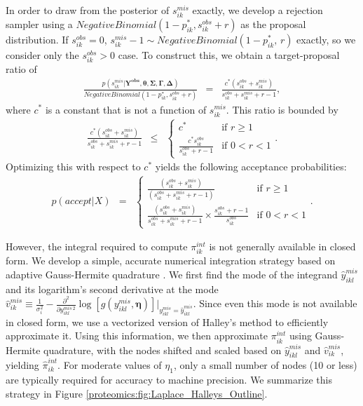 
In order to draw from the posterior of $s_{ik}^{mis}$ exactly, we develop a rejection sampler using a $NegativeBinomial(1 - p_{ik}^*, s_{ik}^{obs} + r)$ as the proposal distribution.
If $s_{ik}^{obs}=0$, $s_{ik}^{mis} - 1 \sim NegativeBinomial(1-p_{ik}^*, \, r)$ exactly, so we consider only the $s_{ik}^{obs} > 0$ case.
To construct this, we obtain a target-proposal ratio of 
\begin{eqnarray*}
\frac{p(s_{ik}^{mis}\vert\mathbf{Y^{obs}},\boldsymbol{\theta},\boldsymbol{\Sigma},\boldsymbol{\Gamma},\boldsymbol{\Delta})}{NegativeBinomial(1-p_{ik}^{*},s_{ik}^{obs}+r)} & = & \frac{c^{*}(s_{ik}^{obs}+s_{ik}^{mis})}{s_{ik}^{obs}+s_{ik}^{mis}+r-1},
\end{eqnarray*}
where $c^{*}$ is a constant that is not a function of $s_{ik}^{mis}$.
This ratio is bounded by
\begin{eqnarray*}
\frac{c^{*}(s_{ik}^{obs}+s_{ik}^{mis})}{s_{ik}^{obs}+s_{ik}^{mis}+r-1} & \leq & \begin{cases}
c^{*} & \text{if }r\geq1\\
\frac{c^{*}s_{ik}^{obs}}{s_{ik}^{obs}+r-1} & \text{if }0<r<1
\end{cases}.
\end{eqnarray*}
Optimizing this with respect to $c^*$ yields the following acceptance probabilities:
\begin{eqnarray*}
p(accept \vert X) & = & \begin{cases}
\frac{(s_{ik}^{obs}+s_{ik}^{mis})}{(s_{ik}^{obs}+s_{ik}^{mis}+r-1)} & \text{if }r\geq1\\
\frac{(s_{ik}^{obs}+s_{ik}^{mis})}{s_{ik}^{obs}+s_{ik}^{mis}+r-1} \times \frac{s_{ik}^{obs}+r-1}{s_{ik}^{obs}} & \text{if }0<r<1
\end{cases}.
\end{eqnarray*}

However, the integral required to compute $\pi_{ik}^{int}$ is not generally available in closed form.
We develop a simple, accurate numerical integration strategy based on adaptive Gauss-Hermite quadrature \citep{Liu1994}.
We first find the mode of the integrand $\hat{y}^{mis}_{ikl}$ and its logarithm's second derivative at the mode $\hat{v}_{ik}^{mis} \equiv \frac{1}{\sigma_i^2} - \frac{\partial^2}{\partial y_{ikl}^{mis\,2}}\log\left[g(y_{ikl}^{mis}, \bm \eta) \right] \Big|_{y_{ikl}^{mis} = \hat{y}^{mis}_{ikl}}$.
Since even this mode is not available in closed form, we use a vectorized version of Halley's method to efficiently approximate it.
Using this information, we then approximate $\pi_{ik}^{int}$ using Gauss-Hermite quadrature, with the nodes shifted and scaled based on $\hat{y}^{mis}_{ikl}$ and $\hat{v}_{ik}^{mis}$, yielding $\hat{\pi}_{ik}^{int}$.
For moderate values of $\eta_1$, only a small number of nodes (10 or less) are typically required for accuracy to machine precision.
We summarize this strategy in Figure \ref{proteomics:fig:Laplace_Halleys_Outline}.%

